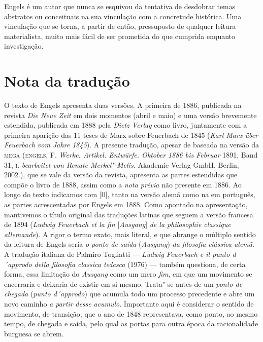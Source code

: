 Engels é um autor que nunca se esquivou da tentativa de desdobrar temas
abstratos ou conceituais na sua vinculação com a concretude histórica.
Uma vinculação que se torna, a partir de então, pressuposto de qualquer
leitura materialista, muito mais fácil de ser prometida do que cumprida
enquanto investigação.

\pagebreak
\section*{Nota da tradução}

O texto de Engels apresenta duas versões. A primeira de 1886, publicada
na revista \emph{Die Neue Zeit} em dois momentos (abril e maio) e uma
versão brevemente estendida, publicada em 1888 pela \emph{Dietz Verlag}
como livro, juntamente com a primeira aparição das 11 teses de Marx
sobre Feuerbach de 1845 (\emph{Karl Marx über Feuerbach vom Jahre
1845}). A presente tradução, apesar de baseada na versão da
\textsc{mega} (\textsc{engels}, F. \emph{Werke. Artikel. Entwürfe.
Oktober 1886 bis Februar} 1891, Band 31, \textsc{i}. \emph{bearbeitet
von Renate Merkel"-Melis.} Akademie Verlag GmbH, Berlin, 2002.), que se
vale da versão da revista, apresenta as partes estendidas que compõe o
livro de 1888, assim como a \emph{nota prévia} não presente em 1886. Ao
longo do texto indicamos com {[}ǁǁ{]}, tanto na versão alemã como na em
português, as partes acrescentadas por Engels em 1888. Como apontado na
apresentação, mantivemos o título original das traduções latinas que
seguem a versão francesa de 1894 (\emph{Ludwig Feuerbach et la fin}
{[}\emph{Ausgang}{]} \emph{de la philosophie classique allemande}). A
rigor o termo exato, mais literal, e que abrange o múltiplo sentido da
leitura de Engels seria \emph{o ponto de saída} (\emph{Ausgang})
\emph{da filosofia clássica alemã}. A tradução italiana de Palmiro
Togliatti --- \emph{Ludwig Feuerbach e il punto d´approdo della filosofia
classica tedesca} (1976) --- também questiona, de certa forma, essa
limitação do \emph{Ausgang} como um mero \emph{fim}, em que um movimento
se encerraria e deixaria de existir em si mesmo. Trata"-se antes de um
\emph{ponto de chegada} (\emph{punto d´approdo}) que acumula todo um
processo precedente e abre um novo caminho \emph{a partir} \emph{desse}
\emph{acumulo}. Importante aqui é considerar o sentido de movimento, de
transição, que o ano de 1848 representava, como ponto, ao mesmo tempo,
de chegada e saída, pelo qual as portas para outra época da
racionalidade burguesa se abrem.
